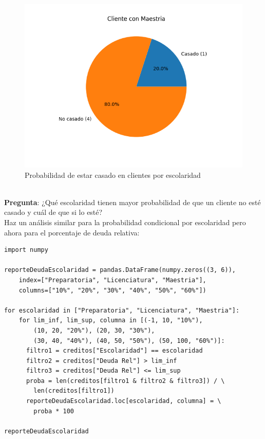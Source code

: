 \documentclass{article}
\begin{document}
\begin{figure}[h]
\begin{minipage}{0.3\textwidth}
        \centering
        \includegraphics[width=\textwidth]{figures/r1-Maestria-casado.png}
    \end{minipage}
    \captionsetup{width=0.9\textwidth}
    \caption{Probabilidad de estar casado en clientes por escolaridad}
    \label{fig:escolaridad_casado}
\end{figure}
\\[12pt]
\textbf{Pregunta}: ¿Qué escolaridad tienen mayor probabilidad de que un cliente no esté casado y cuál de que si lo esté?
\\[12pt]
Haz un análisis similar para la probabilidad condicional por escolaridad pero ahora para el porcentaje de deuda relativa:
\begin{verbatim}
import numpy

reporteDeudaEscolaridad = pandas.DataFrame(numpy.zeros((3, 6)), 
    index=["Preparatoria", "Licenciatura", "Maestria"], 
    columns=["10%", "20%", "30%", "40%", "50%", "60%"])

for escolaridad in ["Preparatoria", "Licenciatura", "Maestria"]:
    for lim_inf, lim_sup, columna in [(-1, 10, "10%"), 
        (10, 20, "20%"), (20, 30, "30%"), 
        (30, 40, "40%"), (40, 50, "50%"), (50, 100, "60%")]:
      filtro1 = creditos["Escolaridad"] == escolaridad
      filtro2 = creditos["Deuda Rel"] > lim_inf
      filtro3 = creditos["Deuda Rel"] <= lim_sup
      proba = len(creditos[filtro1 & filtro2 & filtro3]) / \
        len(creditos[filtro1])
      reporteDeudaEscolaridad.loc[escolaridad, columna] = \
        proba * 100

reporteDeudaEscolaridad
\end{verbatim}
\end{document}
